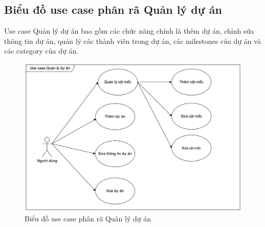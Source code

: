 \documentclass[../DoAn.tex]{subfiles}
\begin{document}
\subsection{Biểu đồ use case phân rã Quản lý dự án}
\label{subsection:2.2.4}
Use case Quản lý dự án bao gồm các chức năng chính là thêm dự án, chỉnh sửa thông tin dự án, quản lý các thành viên trong dự án,
các milestones của dự án và các category của dự án.
\begin{figure}[H]
    \centering
    \includegraphics[width=1.0\linewidth]{Hinhve/ProjectUseCases.png}
    \caption{Biểu đồ use case phân rã Quản lý dự án}
    \label{fig:ProjectUseCases}
\end{figure}
\newpage

\end{document}
